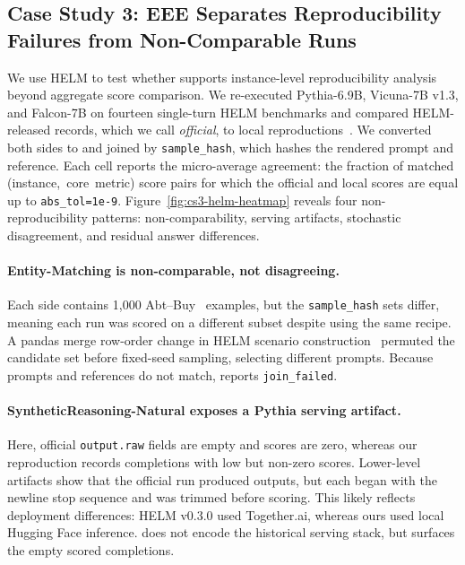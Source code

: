 \subsection{Case Study 3: EEE Separates Reproducibility Failures from Non-Comparable Runs}%
\label{sec:cs3-helm}

We use HELM to test whether \eee{} supports instance-level reproducibility
  analysis beyond aggregate score comparison.
We re-executed Pythia-6.9B, Vicuna-7B v1.3, and Falcon-7B on fourteen
  single-turn HELM benchmarks and compared HELM-released records, which we call
  \emph{official}, to local
  reproductions~\citep{helm,pmlr-v202-biderman23a,vicuna2023,almazrouei2023falcon}.
We converted both sides to \eee{} and joined by \texttt{sample\_hash}, which
  hashes the rendered prompt and reference.
Each cell reports the micro-average agreement: the fraction of matched
  \mbox{(instance, core metric)} score pairs for which the official and local
  scores are equal up to \texttt{abs\_tol=1e-9}.
Figure~\ref{fig:cs3-helm-heatmap} reveals four non-reproducibility patterns:
  non-comparability, serving artifacts, stochastic disagreement, and residual
  answer differences.

\paragraph{Entity-Matching is non-comparable, not disagreeing.}
Each side contains 1{,}000 Abt--Buy~\cite{kopcke2010evaluation} examples, but
  the \texttt{sample\_hash} sets differ, meaning each run was scored on a
  different subset despite using the same recipe.
A pandas merge row-order change in HELM scenario
  construction~\citep{mckinney2010data,pandas_merge_docs} permuted the candidate
  set before fixed-seed sampling, selecting different prompts.
Because prompts and references do not match, \eee{} reports
  \texttt{join\_failed}.

\paragraph{SyntheticReasoning-Natural exposes a Pythia serving artifact.}
Here, official \texttt{output.raw} fields are empty and scores are zero, whereas
  our reproduction records completions with low but non-zero scores.
Lower-level artifacts show that the official run produced outputs, but each
  began with the newline stop sequence and was trimmed before scoring.
This likely reflects deployment differences: HELM v0.3.0 used Together.ai,
  whereas ours used local Hugging Face inference.
\eee{} does not encode the historical serving stack, but surfaces the empty
  scored completions.

